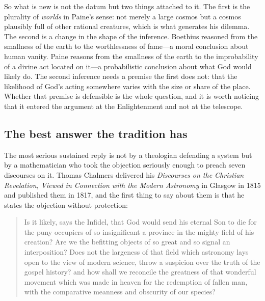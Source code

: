 So what is new is not the datum but two things attached to it. The first is the plurality of \emph{worlds} in Paine's sense: not merely a large cosmos but a cosmos plausibly full of other rational creatures, which is what generates his dilemma. The second is a change in the shape of the inference. Boethius reasoned from the smallness of the earth to the worthlessness of fame---a moral conclusion about human vanity. Paine reasons from the smallness of the earth to the improbability of a divine act located on it---a probabilistic conclusion about what God would likely do. The second inference needs a premise the first does not: that the likelihood of God's acting somewhere varies with the size or share of the place. Whether that premise is defensible is the whole question, and it is worth noticing that it entered the argument at the Enlightenment and not at the telescope.

\subsection{The best answer the tradition has}

The most serious sustained reply is not by a theologian defending a system but by a mathematician who took the objection seriously enough to preach seven discourses on it. Thomas Chalmers delivered his \emph{Discourses on the Christian Revelation, Viewed in Connection with the Modern Astronomy} in Glasgow in 1815 and published them in 1817, and the first thing to say about them is that he states the objection without protection:

\begin{quote}\small
Is it likely, says the Infidel, that God would send his eternal Son to die for the puny occupiers of so insignificant a province in the mighty field of his creation? Are we the befitting objects of so great and so signal an interposition? Does not the largeness of that field which astronomy lays open to the view of modern science, throw a suspicion over the truth of the gospel history? and how shall we reconcile the greatness of that wonderful movement which was made in heaven for the redemption of fallen man, with the comparative meanness and obscurity of our species?
\end{quote}

